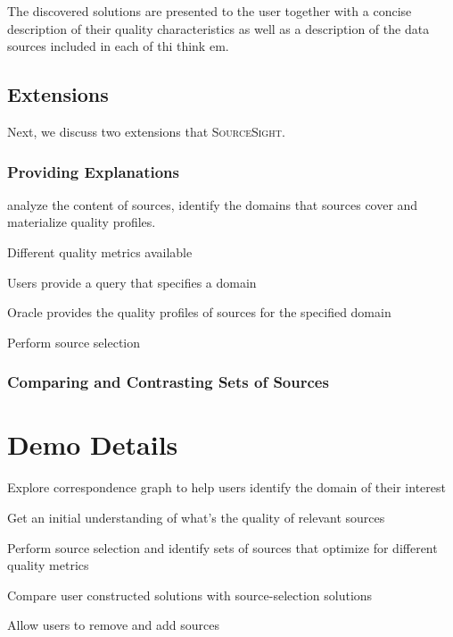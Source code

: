 \documentclass{vldb}
\newcommand\system{\textsc{SourceSight}}
\begin{document}
The discovered solutions are presented to the user together with a concise description of their quality characteristics as well as a description of the data sources included in each of thi think em. 

\subsection{Extensions}
Next, we discuss two extensions that \system.
\subsubsection{Providing Explanations}

analyze the content of sources, identify the domains that sources cover and materialize quality profiles. 

Different quality metrics available 

Users provide a query that specifies a domain

Oracle provides the quality profiles of sources for the specified domain

Perform source selection

\subsubsection{Comparing and Contrasting Sets of Sources}


\section{Demo Details}

Explore correspondence graph to help users identify the domain of their interest

Get an initial understanding of what's the quality of relevant sources

Perform source selection and identify sets of sources that optimize for different
quality metrics

Compare user constructed solutions with source-selection solutions

Allow users to remove and add sources



\end{document}
